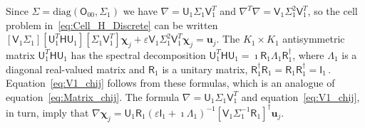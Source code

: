 \documentclass[english,12pt,jmp,graphicx]{revtex4-1}
\newcommand{\vecu}{\boldsymbol{u}}
\newcommand{\vecchi}{\boldsymbol{\chi}}
\newcommand{\Hm}{\mathsf{H}}
\newcommand{\Um}{\mathsf{U}}
\newcommand{\Vm}{\mathsf{V}}
\newcommand{\Rm}{\mathsf{R}}
\newcommand{\Ib}{\mathsf{I}}
\newcommand{\Om}{\mathsf{O}}
\begin{document}
Since
$\Sigma=\text{diag}(\Om_{00},\Sigma_1)$  
we have
$\nabla=\Um_1\Sigma_1\Vm_1^T$ and 
$\nabla^T\nabla=\Vm_1\Sigma^2_1\Vm_1^T$,
so
the cell
problem in~\eqref{eq:Cell_H_Discrete} can be written 
$[\Vm_1\Sigma_1][\Um_1^T\Hm\Um_1][\Sigma_1\Vm_1^T]\vecchi_j+\varepsilon\Vm_1\Sigma_1^2\Vm_1^T\vecchi_j=\vecu_j.$
The $K_1\times K_1$ antisymmetric matrix $\Um_1^T\Hm\Um_1$ has the
spectral decomposition
$\Um_1^T\Hm\Um_1=\imath\Rm_1\Lambda_1\Rm_1^\dagger$, where $\Lambda_1$
is a diagonal real-valued matrix and $\Rm_1$ is a unitary 
matrix, $\Rm_1^\dagger\Rm_1=\Rm_1\Rm_1^\dagger=\Ib_1\,.$
Equation~\eqref{eq:V1_chij} follows from these formulas, which is an
analogue of equation~\eqref{eq:Matrix_chij}. 
The formula $\nabla=\Um_1\Sigma_1\Vm_1^T$ and
equation~\eqref{eq:V1_chij}, in turn, imply that
$\nabla\vecchi_j=\Um_1\Rm_1(\varepsilon\Ib_1+\imath\Lambda_1)^{-1}
                   [\Vm_1\Sigma_1^{-1}\Rm_1]^\dagger\vecu_j.$
\end{document}
